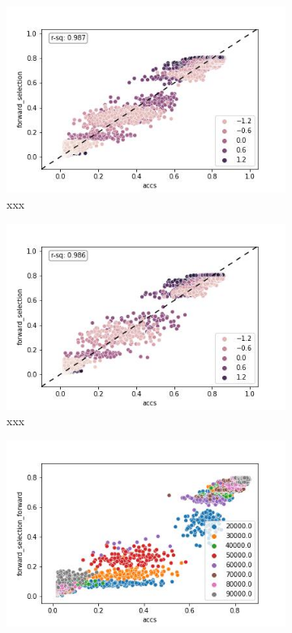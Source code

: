 \documentclass{article} %
\begin{document}
\begin{figure}
    \begin{subfigure}{.33\textwidth}
        \centering
        \includegraphics[width=.98\linewidth]{emnist/arctan_all_epochs_forward_selection.jpg}
        \caption{xxx}
        \label{fig:emnist_prediction_plot_train}
    \end{subfigure}%
    \begin{subfigure}{.33\textwidth}
        \centering
        \includegraphics[width=.98\linewidth]{emnist/arctan_all_epochs_forward_selection_val.jpg}
        \caption{xxx}
        \label{fig:emnist_prediction_plot_val}
    \end{subfigure}
    \begin{subfigure}{.33\textwidth}
        \centering
        \includegraphics[width=.98\linewidth]{emnist/arctan_all_epochs_forward_selection_train.jpg}

\end{subfigure}
\end{figure}
\end{document}
